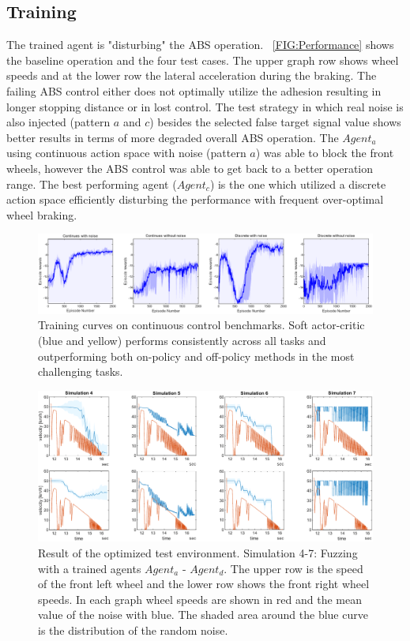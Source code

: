 \documentclass[a4paper, fleqn]{template/cas-dc}
\begin{document}
	\subsection{Training}
	The trained agent is "disturbing" the ABS operation. ~\autoref{FIG:Performance} shows the baseline operation and the four test cases. The upper graph row shows wheel speeds and at the lower row the lateral acceleration during the braking. The failing ABS control either does not optimally utilize the adhesion resulting in longer stopping distance or in lost control. The test strategy in which real noise is also injected (pattern $a$ and $c$) besides the selected false target signal value shows better results in terms of more degraded overall ABS operation. The $Agent_a$ using continuous action space with noise (pattern $a$) was able to block the front wheels, however the ABS control was able to get back to a better operation range. The best performing agent ($Agent_c$) is the one which utilized a discrete action space efficiently disturbing the performance with frequent over-optimal wheel braking.
	
	\begin{figure}[hb]
		\centering
		\includegraphics[width=\textwidth]{figures/SAC_all_statistics.pdf}
		\caption{Training curves on continuous control benchmarks. Soft actor-critic (blue and yellow) performs
			consistently across all tasks and outperforming both on-policy and off-policy methods in the most challenging
			tasks.}
		\label{FIG:TrainingResult}
	\end{figure}		
	
	\begin{figure}[h]
		\centering
		\includegraphics[width=\textwidth]{figures/SAC_all_wheelspeeds.pdf}
		\caption{Result of the optimized test environment. Simulation 4-7: Fuzzing with a trained agents $Agent_a$ - $Agent_d$. The upper row is the speed of the front left wheel and the lower row shows the front right wheel speeds. In each graph wheel speeds are shown in red and the mean value of the noise with blue. The shaded area around the blue curve is the distribution of the random noise.}
		\label{FIG:TestResults}
	\end{figure}	
	
\end{document}
